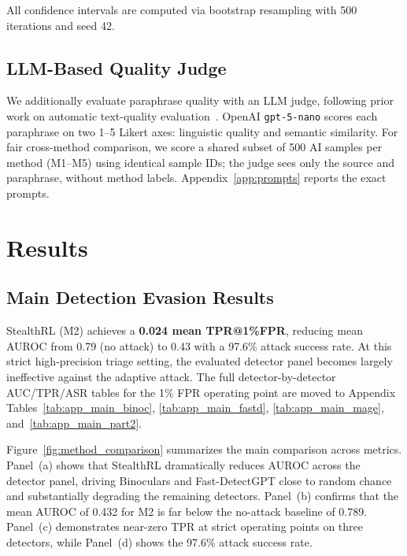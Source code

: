 \documentclass[11pt]{article}
\begin{document}
All confidence intervals are computed via bootstrap resampling with 500 iterations and seed 42.

\subsection{LLM-Based Quality Judge}

We additionally evaluate paraphrase quality with an LLM judge, following prior work on automatic text-quality evaluation~\cite{fu2023gptscore,kim2024prometheus2,vu2024foundationalautoraters}. OpenAI \texttt{gpt-5-nano} scores each paraphrase on two 1--5 Likert axes: linguistic quality and semantic similarity. For fair cross-method comparison, we score a shared subset of 500 AI samples per method (M1--M5) using identical sample IDs; the judge sees only the source and paraphrase, without method labels. Appendix~\ref{app:prompts} reports the exact prompts.

\section{Results}
\label{sec:results}

\subsection{Main Detection Evasion Results}

StealthRL (M2) achieves a \textbf{0.024 mean TPR@1\%FPR}, reducing mean AUROC from 0.79 (no attack) to 0.43 with a 97.6\% attack success rate. At this strict high-precision triage setting, the evaluated detector panel becomes largely ineffective against the adaptive attack. The full detector-by-detector AUC/TPR/ASR tables for the 1\% FPR operating point are moved to Appendix Tables~\ref{tab:app_main_binoc}, \ref{tab:app_main_fastd}, \ref{tab:app_main_mage}, and~\ref{tab:app_main_part2}.

Figure~\ref{fig:method_comparison} summarizes the main comparison across metrics. Panel~(a) shows that StealthRL dramatically reduces AUROC across the detector panel, driving Binoculars and Fast-DetectGPT close to random chance and substantially degrading the remaining detectors. Panel~(b) confirms that the mean AUROC of 0.432 for M2 is far below the no-attack baseline of 0.789. Panel~(c) demonstrates near-zero TPR at strict operating points on three detectors, while Panel~(d) shows the 97.6\% attack success rate.
\end{document}
